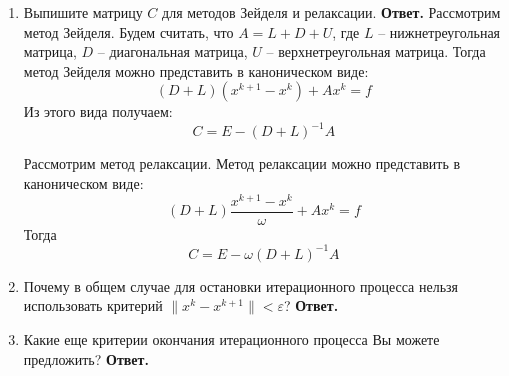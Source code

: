\documentclass{article}
\begin{document}
\begin{enumerate}
        \item Выпишите матрицу $C$ для методов Зейделя и релаксации.
        \newline
        {\bfseries Ответ.} 
        Рассмотрим метод Зейделя.
        Будем считать, что $A = L + D + U$, где $L$ -- нижнетреугольная матрица, $D$ -- 
        диагональная матрица, $U$ -- верхнетреугольная матрица.
        Тогда метод Зейделя можно представить в каноническом виде: 
        \begin{equation*}
            (D + L)(x^{k+1} -x^k) + Ax^k = f
        \end{equation*}
        Из этого вида получаем:
        \begin{equation*}
            C = E - (D+L)^{-1}A
        \end{equation*}

        Рассмотрим метод релаксации.
        Метод релаксации можно представить в каноническом виде: 
        \begin{equation*}
            (D + L)\frac{x^{k+1} -x^k}{\omega} + Ax^k = f
        \end{equation*}
        Тогда 
        \begin{equation*}
            C = E - \omega(D+L)^{-1}A
        \end{equation*}
        \item Почему в общем случае для остановки итерационного
        процесса нельзя использовать критерий $\|x^k - x^{k+1}\| < \varepsilon$?
        \newline
        {\bfseries Ответ.}

        \item Какие еще критерии окончания итерационного процесса
        Вы можете предложить?
        \newline
        {\bfseries Ответ.}

    \end{enumerate}
    
\end{document}
